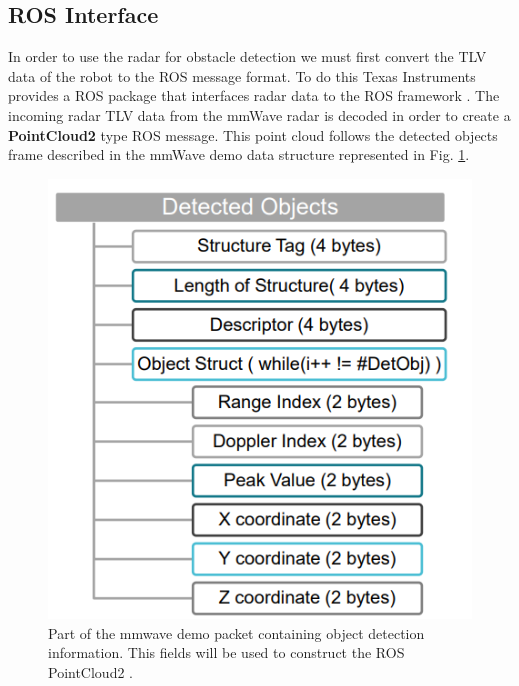 



\subsection{ROS Interface}
In order to use the radar for obstacle detection we must first convert the \ac{TLV} data of the robot to the \ac{ROS} message format.
To do this Texas Instruments provides a \ac{ROS} package that interfaces radar data to the ROS framework \cite{tisetup}. The incoming radar \ac{TLV} data from the mmWave radar is decoded in order to create a  \textbf{PointCloud2} type ROS message.
This point cloud follows the detected objects frame described in the mmWave demo data structure \cite{mmdata} represented in Fig. \ref{fig:demodata}.
\begin{figure}[!htb]
    \centering
    \includegraphics[scale=0.6]{imgs/chapter4/demodata.png}
    \caption[Part of the mmwave demo packet]{Part of the mmwave demo packet containing object detection information. This fields will be used to construct the ROS PointCloud2 \cite{mmdata}.}
    \label{fig:demodata}
\end{figure}
